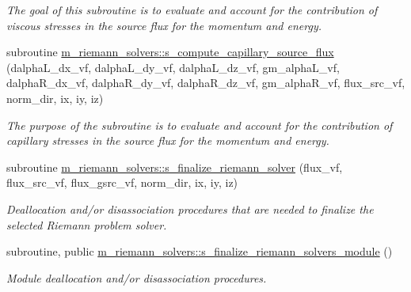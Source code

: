 \begin{DoxyCompactItemize}
\begin{DoxyCompactList}\small\item\em The goal of this subroutine is to evaluate and account for the contribution of viscous stresses in the source flux for the momentum and energy. \end{DoxyCompactList}\item 
subroutine \hyperlink{namespacem__riemann__solvers_aeab4abb9a37e1f537fee511bdcadc9da}{m\+\_\+riemann\+\_\+solvers\+::s\+\_\+compute\+\_\+capillary\+\_\+source\+\_\+flux} (dalpha\+L\+\_\+dx\+\_\+vf, dalpha\+L\+\_\+dy\+\_\+vf, dalpha\+L\+\_\+dz\+\_\+vf, gm\+\_\+alpha\+L\+\_\+vf, dalpha\+R\+\_\+dx\+\_\+vf, dalpha\+R\+\_\+dy\+\_\+vf, dalpha\+R\+\_\+dz\+\_\+vf, gm\+\_\+alpha\+R\+\_\+vf, flux\+\_\+src\+\_\+vf, norm\+\_\+dir, ix, iy, iz)
\begin{DoxyCompactList}\small\item\em The purpose of the subroutine is to evaluate and account for the contribution of capillary stresses in the source flux for the momentum and energy. \end{DoxyCompactList}\item 
subroutine \hyperlink{namespacem__riemann__solvers_ab679d890c95c6cb1ee3dc5e5a9ae1c19}{m\+\_\+riemann\+\_\+solvers\+::s\+\_\+finalize\+\_\+riemann\+\_\+solver} (flux\+\_\+vf, flux\+\_\+src\+\_\+vf, flux\+\_\+gsrc\+\_\+vf, norm\+\_\+dir, ix, iy, iz)
\begin{DoxyCompactList}\small\item\em Deallocation and/or disassociation procedures that are needed to finalize the selected Riemann problem solver. \end{DoxyCompactList}\item 
subroutine, public \hyperlink{namespacem__riemann__solvers_a5bd1ce6fbbb840b5b1c6dd97ccb8d674}{m\+\_\+riemann\+\_\+solvers\+::s\+\_\+finalize\+\_\+riemann\+\_\+solvers\+\_\+module} ()
\begin{DoxyCompactList}\small\item\em Module deallocation and/or disassociation procedures. \end{DoxyCompactList}\end{DoxyCompactItemize}
